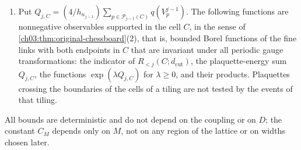 \begin{lemma}
\begin{enumerate}
\[
 \mathcal F_\ell(C)=\Bigl\{p\in\Faces{n_\ell}:\bigcup_{v\text{ a vertex of }p}\mathsf B_{m_\ell}(m_\ell v)\subset C\Bigr\},
\]
where the vertices $v$ are written in level-$\ell$ lattice units, and for $d_{\mathrm{cut}}>0$ let
\[
 R_{<j}(C;d_{\mathrm{cut}})=\bigcap_{\ell<j}\bigcap_{p\in\mathcal F_\ell(C)}\bigl\{q(V^\ell_p)<d_{\mathrm{cut}}\bigr\},\qquad R^{\mathcal T}_{<j}(d_{\mathrm{cut}})=\bigcap_{C\in\mathcal T}R_{<j}(C;d_{\mathrm{cut}}).
\]
These events impose the conditions on every $\mathcal P_\ell(P)$, $\ell<j$, for the six level-$j$ plaquettes $P$ in $C$. Further, put
\[
 \mathcal P^{\mathcal T}_{j-1}=\bigcup_{C\in\mathcal T}\mathcal P_{j-1}(C),\qquad Q^{\mathcal T}_j=\frac4{h_{n_{j-1}}}\sum_{p\in\mathcal P^{\mathcal T}_{j-1}}q(V^{j-1}_p),
\]
where $h_n=g_n^2=\gamma/n$.
\item Put $Q_{j,C}=(4/h_{n_{j-1}})\sum_{p\in\mathcal P_{j-1}(C)}q(V^{j-1}_p)$. The following functions are nonnegative observables supported in the cell $C$, in the sense of \cref{ch03:thm:original-chessboard}(2), that is, bounded Borel functions of the fine links with both endpoints in $C$ that are invariant under all periodic gauge transformations: the indicator of $R_{<j}(C;d_{\mathrm{cut}})$, the plaquette-energy sum $Q_{j,C}$, the functions $\exp(\lambda Q_{j,C})$ for $\lambda\ge0$, and their products. Plaquettes crossing the boundaries of the cells of a tiling are not tested by the events of that tiling.
\end{enumerate}
All bounds are deterministic and do not depend on the coupling or on $D$; the constant $C_M$ depends only on $M$, not on any region of the lattice or on widths chosen later.
\end{lemma}

